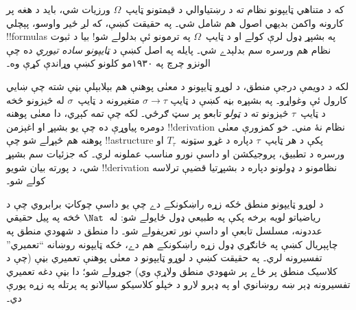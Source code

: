\documentclass[../../../include/open-logic-section]{subfiles}
\begin{document}
که د متناهي ټايپونو نظام ته د رښتياوالي د قيمتونو ټايپ~$\Omega$
ورزيات شي، بايد د هغه پر کارونه واکمن بديهي اصول هم شامل شي۔ په حقيقت
کښې، که لږ ځير واوسو، پېچلي !!{formula}s په بشپړ ډول لرې کولے او د
ټايپ~$\Omega$ په ترمونو ئې بدلولے شو!{} بيا د ثبوت نظام هم ورسره سم
بدلېدے شي۔ پايله په اصل کښې د \emph{ټايپونو ساده تيوري} ده چې الونزو
چرچ په ۱۹۳۰مو کلونو کښې وړاندې کړې وه۔

لکه د دويمې درجې منطق، د لوړو ټايپونو د معنٰی پوهنې هم بېلابېلې بڼې
شته چې ښايي کارول ئې وغواړو۔ په بشپړه بڼه کښې د ټايپ
$\sigma \to \tau$ متغيرونه د ټايپ~$\sigma$ له څيزونو څخه د
ټايپ~$\tau$ څيزونو ته د \emph{ټولو} تابعو پر سټ ګرځي۔ لکه چې تمه
کېږي، دا معنٰی پوهنه دومره پياوړې ده چې يو بشپړ او اغېزمن
!!{derivation} نظام نۀ مني۔ خو کمزورې معنٰی پوهنه هم څېړلے شو چې
!!a{structure} پکې د هر ټايپ~$\tau$ دپاره د غړو سټونه~$T_\tau$ او
ورسره د تطبيق، پروجيکشن او داسې نورو مناسب عملونه لري۔ که جزئيات سم
بشپړ شي، د پورته بيان شويو !!{derivation} نظامونو د ډولونو دپاره د
بشپړتيا قضيې ترلاسه کولے شو۔

د لوړو ټايپونو منطق ځکه زړه راښکونکے دے چې يو داسې چوکاټ برابروي چې
د رياضياتو لويه برخه پکې په طبيعي ډول ځايولے شو: له~$\Nat$ څخه په
پيل حقيقي عددونه، مسلسل تابعې او داسې نور تعريفولے شو۔ دا منطق د
شهودي منطق په چاپېريال کښې په ځانګړي ډول زړه راښکونکے هم دے، ځکه
ټايپونه روښانه ``تعميري'' تفسيرونه لري۔ په حقيقت کښې د لوړو ټايپونو
د معنٰی پوهنې تعميري بڼې (چې د کلاسیک منطق پر ځاے پر شهودي منطق
ولاړې وي) جوړولے شو؛ دا بڼې دغه تعميري تفسيرونه ډېر ښه روښانوي او په
ډېرو لارو د خپلو کلاسیکو سيالانو په پرتله په زړه پورې دي۔
\end{document}
